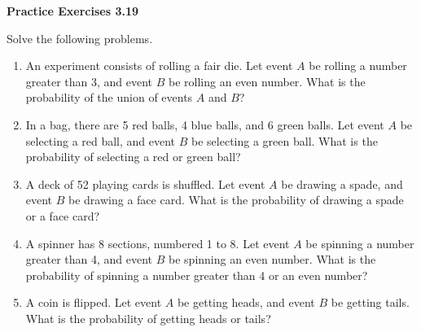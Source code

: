 \vspace{0.3ex}
\noindent\textbf{Practice Exercises 3.19}

\vspace{0.2ex}

Solve the following problems.

\begin{enumerate}[label=\color{blue}\arabic*.]
    \item An experiment consists of rolling a fair die. Let event \(A\) be rolling a number greater than 3, and event \(B\) be rolling an even number. What is the probability of the union of events \(A\) and \(B\)?
    \item In a bag, there are 5 red balls, 4 blue balls, and 6 green balls. Let event \(A\) be selecting a red ball, and event \(B\) be selecting a green ball. What is the probability of selecting a red or green ball?
    \item A deck of 52 playing cards is shuffled. Let event \(A\) be drawing a spade, and event \(B\) be drawing a face card. What is the probability of drawing a spade or a face card?
    \item A spinner has 8 sections, numbered 1 to 8. Let event \(A\) be spinning a number greater than 4, and event \(B\) be spinning an even number. What is the probability of spinning a number greater than 4 or an even number?
    \item A coin is flipped. Let event \(A\) be getting heads, and event \(B\) be getting tails. What is the probability of getting heads or tails?
\end{enumerate}
